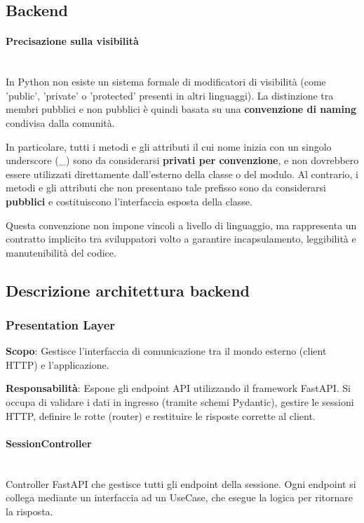 \documentclass[a4paper,12pt]{article}
\begin{document}
        \subsection{Backend}
        \paragraph{Precisazione sulla visibilità}\mbox{}\\
            In Python non esiste un sistema formale di modificatori di visibilità (come 'public', 'private' o 'protected' presenti in altri linguaggi). La distinzione tra membri pubblici e non pubblici è quindi basata su una \textbf{convenzione di naming} condivisa dalla comunità.

            In particolare, tutti i metodi e gli attributi il cui nome inizia con un singolo underscore (\_) sono da considerarsi \textbf{privati per convenzione}, e non dovrebbero essere utilizzati direttamente dall'esterno della classe o del modulo. Al contrario, i metodi e gli attributi che non presentano tale prefisso sono da considerarsi \textbf{pubblici} e costituiscono l'interfaccia esposta della classe.
            
            Questa convenzione non impone vincoli a livello di linguaggio, ma rappresenta un contratto implicito tra sviluppatori volto a garantire incapsulamento, leggibilità e manutenibilità del codice.

        
        \subsection{Descrizione architettura backend}
            \subsubsection{Presentation Layer}
                \textbf{Scopo}: Gestisce l'interfaccia di comunicazione tra il mondo esterno (client HTTP) e l'applicazione.

                \noindent \textbf{Responsabilità}: Espone gli endpoint API utilizzando il framework FastAPI. Si occupa di validare i dati in ingresso (tramite schemi Pydantic), gestire le sessioni HTTP, definire le rotte (router) e restituire le risposte corrette al client.
            
                \paragraph{SessionController}\mbox{}\\
                    Controller FastAPI che gestisce tutti gli endpoint della sessione. Ogni endpoint si collega mediante un interfaccia ad un UseCase, che esegue la logica per ritornare la risposta.
\end{document}
